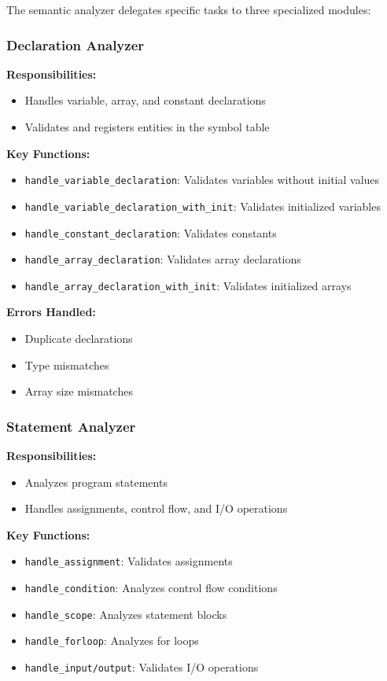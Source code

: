 \documentclass[12pt,a4paper]{article}
\begin{document}
The semantic analyzer delegates specific tasks to three specialized modules:

\subsubsection{Declaration Analyzer}

\textbf{Responsibilities:}
\begin{itemize}
    \item Handles variable, array, and constant declarations
    \item Validates and registers entities in the symbol table
\end{itemize}

\textbf{Key Functions:}
\begin{itemize}
    \item \texttt{handle\_variable\_declaration}: Validates variables without initial values
    \item \texttt{handle\_variable\_declaration\_with\_init}: Validates initialized variables
    \item \texttt{handle\_constant\_declaration}: Validates constants
    \item \texttt{handle\_array\_declaration}: Validates array declarations
    \item \texttt{handle\_array\_declaration\_with\_init}: Validates initialized arrays
\end{itemize}

\textbf{Errors Handled:}
\begin{itemize}
    \item Duplicate declarations
    \item Type mismatches
    \item Array size mismatches
\end{itemize}

\subsubsection{Statement Analyzer}

\textbf{Responsibilities:}
\begin{itemize}
    \item Analyzes program statements
    \item Handles assignments, control flow, and I/O operations
\end{itemize}

\textbf{Key Functions:}
\begin{itemize}
    \item \texttt{handle\_assignment}: Validates assignments
    \item \texttt{handle\_condition}: Analyzes control flow conditions
    \item \texttt{handle\_scope}: Analyzes statement blocks
    \item \texttt{handle\_forloop}: Analyzes for loops
    \item \texttt{handle\_input/output}: Validates I/O operations
\end{itemize}
\end{document}
